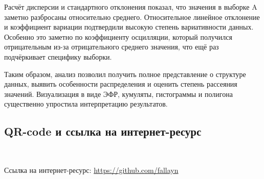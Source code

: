 \documentclass[12pt]{article}
\begin{document}
Расчёт дисперсии и стандартного отклонения показал, что значения в выборке A заметно разбросаны относительно среднего. Относительное линейное отклонение и коэффициент вариации подтвердили высокую степень вариативности данных. Особенно это заметно по коэффициенту осцилляции, который получился отрицательным из-за отрицательного среднего значения, что ещё раз подчёркивает специфику выборки.

Таким образом, анализ позволил получить полное представление о структуре данных, выявить особенности распределения и оценить степень рассеяния значений. Визуализация в виде ЭФР, кумуляты, гистограммы и полигона существенно упростила интерпретацию результатов.

\subsection*{QR-code и ссылка на интернет-ресурс}
\vspace{5mm}
\\
\raggedright
\vspace{5mm}
Ссылка на интернет-ресурс: \url{https://github.com/fallayn}
\end{document}

